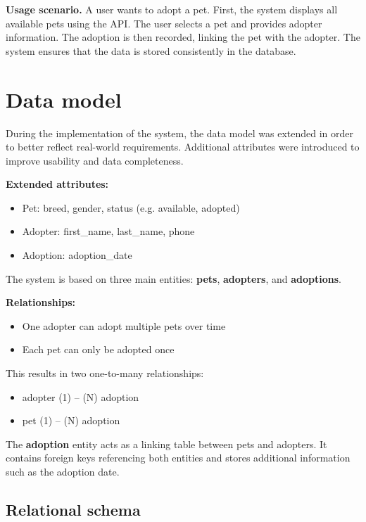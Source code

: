 \documentclass[11pt,a4paper]{article}
\begin{document}
\begin{beispielbox}
\textbf{Usage scenario.}
A user wants to adopt a pet. First, the system displays all available pets using the
API. The user selects a pet and provides adopter information. The adoption is then
recorded, linking the pet with the adopter. The system ensures that the data is
stored consistently in the database.
\end{beispielbox}
\section{Data model}


During the implementation of the system, the data model was extended in order to
better reflect real-world requirements. Additional attributes were introduced to
improve usability and data completeness.

\textbf{Extended attributes:}
\begin{itemize}
\item Pet: breed, gender, status (e.g. available, adopted)
\item Adopter: first\_name, last\_name, phone
\item Adoption: adoption\_date
\end{itemize}

The system is based on three main entities: \textbf{pets}, \textbf{adopters}, and
\textbf{adoptions}.

\textbf{Relationships:}
\begin{itemize}
\item One adopter can adopt multiple pets over time
\item Each pet can only be adopted once
\end{itemize}

This results in two one-to-many relationships:
\begin{itemize}
\item adopter (1) -- (N) adoption
\item pet (1) -- (N) adoption
\end{itemize}

The \textbf{adoption} entity acts as a linking table between pets and adopters.
It contains foreign keys referencing both entities and stores additional information
such as the adoption date.

\subsection{Relational schema}
\end{document}
